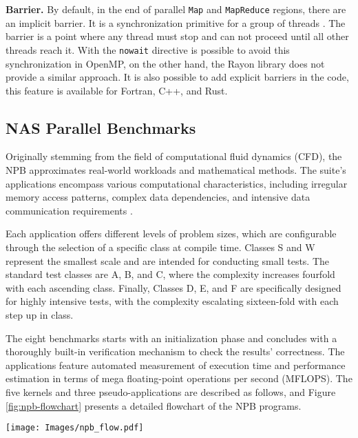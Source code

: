     \textbf{Barrier.} By default, in the end of parallel \texttt{Map} and \texttt{MapReduce} regions, there are an implicit barrier. It is a synchronization primitive for a group of threads \cite{map}. The barrier is a point where any thread must stop and can not proceed until all other threads reach it. With the \texttt{nowait} directive is possible to avoid this synchronization in OpenMP, on the other hand, the Rayon library does not provide a similar approach. It is also possible to add explicit barriers in the code, this feature is available for Fortran, C++, and Rust.
    

    \subsection{NAS Parallel Benchmarks}\label{sec:npb_back}
    Originally stemming from the field of computational fluid dynamics (CFD), the NPB approximates real-world workloads and mathematical methods. The suite's applications encompass various computational characteristics, including irregular memory access patterns, complex data dependencies, and intensive data communication requirements \cite{NPBOriginal1}. 
    
    Each application offers different levels of problem sizes, which are configurable through the selection of a specific class at compile time. Classes S and W represent the smallest scale and are intended for conducting small tests. The standard test classes are A, B, and C, where the complexity increases fourfold with each ascending class. Finally, Classes D, E, and F are specifically designed for highly intensive tests, with the complexity escalating sixteen-fold with each step up in class.
    
    The eight benchmarks starts with an initialization phase and concludes with a thoroughly built-in verification mechanism to check the results' correctness. The applications feature automated measurement of execution time and performance estimation in terms of mega floating-point operations per second (MFLOPS). The five kernels and three pseudo-applications are described as follows, and Figure \ref{fig:npb-flowchart} presents a detailed flowchart of the NPB programs.

            \begin{figure*}[h!t!]
        \centering
        \texttt{[image: Images/npb\_flow.pdf]}
        \caption{NPB kernels and pseudo-applications flowchart. Adapted from \cite{beyond}.}
        \label{fig:npb-flowchart}
        \vspace{-0.4cm}
        \end{figure*}
    
